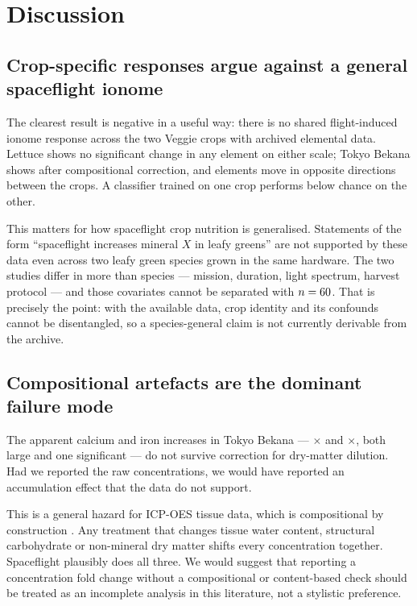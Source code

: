 \section{Discussion}
\label{sec:discussion}

\subsection{Crop-specific responses argue against a general spaceflight ionome}

The clearest result is negative in a useful way: there is no shared
flight-induced ionome response across the two Veggie crops with archived
elemental data. Lettuce shows no significant change in any element on either
scale; Tokyo Bekana shows \NSigCLR{} after compositional correction, and
\NDivergentCLR{} elements move in opposite directions between the crops. A
classifier trained on one crop performs below chance on the other.

This matters for how spaceflight crop nutrition is generalised. Statements of
the form ``spaceflight increases mineral $X$ in leafy greens'' are not supported
by these data even across two leafy green species grown in the same hardware.
The two studies differ in more than species --- mission, duration, light
spectrum, harvest protocol --- and those covariates cannot be separated with
$n=60$. That is precisely the point: with the available data, crop
identity and its confounds cannot be disentangled, so a species-general claim is
not currently derivable from the archive.

\subsection{Compositional artefacts are the dominant failure mode}

The apparent calcium and iron increases in Tokyo Bekana --- \FcTbCa$\times$ and
\FcTbFe$\times$, both large and one significant --- do not survive correction
for dry-matter dilution. Had we reported the raw concentrations, we would have
reported an accumulation effect that the data do not support.

This is a general hazard for ICP-OES tissue data, which is compositional by
construction \citep{aitchison1982}. Any treatment that changes tissue water
content, structural carbohydrate or non-mineral dry matter shifts every
concentration together. Spaceflight plausibly does all three. We would suggest
that reporting a concentration fold change without a compositional or
content-based check should be treated as an incomplete analysis in this
literature, not a stylistic preference.

